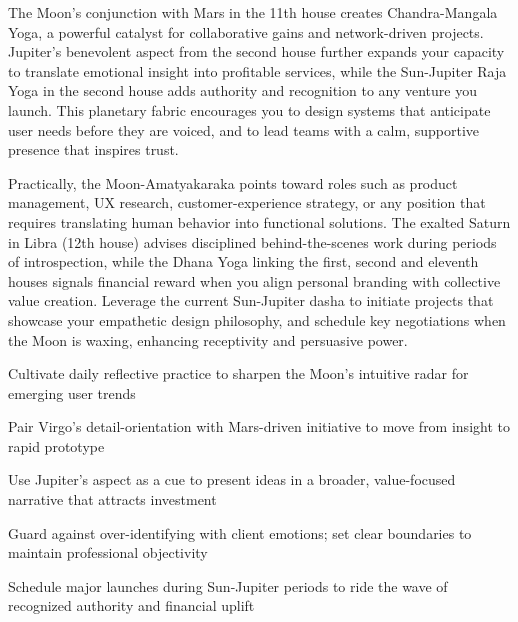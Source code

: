 {\fontsize{9}{13}\selectfont The Moon's conjunction with Mars in the 11th house creates Chandra-Mangala Yoga, a powerful catalyst for collaborative gains and network-driven projects. Jupiter's benevolent aspect from the second house further expands your capacity to translate emotional insight into profitable services, while the Sun-Jupiter Raja Yoga in the second house adds authority and recognition to any venture you launch. This planetary fabric encourages you to design systems that anticipate user needs before they are voiced, and to lead teams with a calm, supportive presence that inspires trust.}\par\vspace{1.8mm}

{\fontsize{9}{13}\selectfont Practically, the Moon-Amatyakaraka points toward roles such as product management, UX research, customer-experience strategy, or any position that requires translating human behavior into functional solutions. The exalted Saturn in Libra (12th house) advises disciplined behind-the-scenes work during periods of introspection, while the Dhana Yoga linking the first, second and eleventh houses signals financial reward when you align personal branding with collective value creation. Leverage the current Sun-Jupiter dasha to initiate projects that showcase your empathetic design philosophy, and schedule key negotiations when the Moon is waxing, enhancing receptivity and persuasive power.}\par\vspace{1.8mm}

\begin{diamondlist}
  \item {\fontsize{8.5}{12}\selectfont Cultivate daily reflective practice to sharpen the Moon's intuitive radar for emerging user trends}
  \item {\fontsize{8.5}{12}\selectfont Pair Virgo's detail-orientation with Mars-driven initiative to move from insight to rapid prototype}
  \item {\fontsize{8.5}{12}\selectfont Use Jupiter's aspect as a cue to present ideas in a broader, value-focused narrative that attracts investment}
  \item {\fontsize{8.5}{12}\selectfont Guard against over-identifying with client emotions; set clear boundaries to maintain professional objectivity}
  \item {\fontsize{8.5}{12}\selectfont Schedule major launches during Sun-Jupiter periods to ride the wave of recognized authority and financial uplift}
\end{diamondlist}

